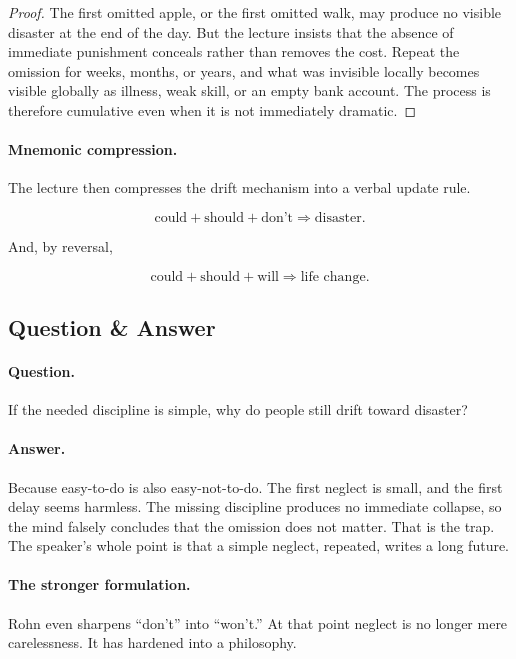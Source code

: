 \begin{proof}
The first omitted apple, or the first omitted walk, may produce no visible disaster at the end of the day. But the lecture insists that the absence of immediate punishment conceals rather than removes the cost. Repeat the omission for weeks, months, or years, and what was invisible locally becomes visible globally as illness, weak skill, or an empty bank account. The process is therefore cumulative even when it is not immediately dramatic.
\end{proof}

\paragraph{Mnemonic compression.}
The lecture then compresses the drift mechanism into a verbal update rule.

\begin{equation}
\text{could}+\text{should}+\text{don't}\Rightarrow \text{disaster}.
\end{equation}

And, by reversal,

\begin{equation}
\text{could}+\text{should}+\text{will}\Rightarrow \text{life change}.
\end{equation}

\subsection{Question \& Answer}

\paragraph{Question.}
If the needed discipline is simple, why do people still drift toward disaster?

\paragraph{Answer.}
Because easy-to-do is also easy-not-to-do. The first neglect is small, and the first delay seems harmless. The missing discipline produces no immediate collapse, so the mind falsely concludes that the omission does not matter. That is the trap. The speaker's whole point is that a simple neglect, repeated, writes a long future.

\paragraph{The stronger formulation.}
Rohn even sharpens ``don't'' into ``won't.'' At that point neglect is no longer mere carelessness. It has hardened into a philosophy.


